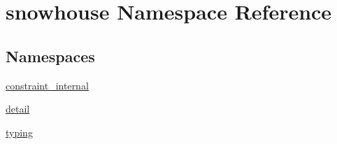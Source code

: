 \hypertarget{namespacesnowhouse}{}\section{snowhouse Namespace Reference}
\label{namespacesnowhouse}
\subsection*{Namespaces}
\begin{DoxyCompactItemize}
\item 
 \mbox{\hyperlink{namespacesnowhouse_1_1constraint__internal}{constraint\+\_\+internal}}
\item 
 \mbox{\hyperlink{namespacesnowhouse_1_1detail}{detail}}
\item 
 \mbox{\hyperlink{namespacesnowhouse_1_1typing}{typing}}
\end{DoxyCompactItemize}
